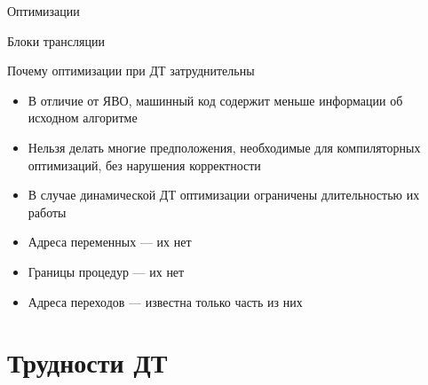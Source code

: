 \documentclass{beamer}
\begin{document}
\begin{frame}{Оптимизации}
\centering


\end{frame}

\begin{frame}{Блоки трансляции}
\centering

\end{frame}

\begin{frame}{Почему оптимизации при ДТ затруднительны}

\begin{itemize}
    \item В отличие от ЯВО, машинный код содержит меньше информации об исходном алгоритме
    \item Нельзя делать многие предположения, необходимые для компиляторных оптимизаций, без нарушения корректности
    \item В случае динамической ДТ оптимизации ограничены длительностью их работы
\end{itemize}\pause

\begin{itemize}
\item Адреса переменных — их нет
\item Границы процедур — их нет
\item Адреса переходов — известна только часть из них
\end{itemize}


\end{frame}

\section{Трудности ДТ}
\end{document}
